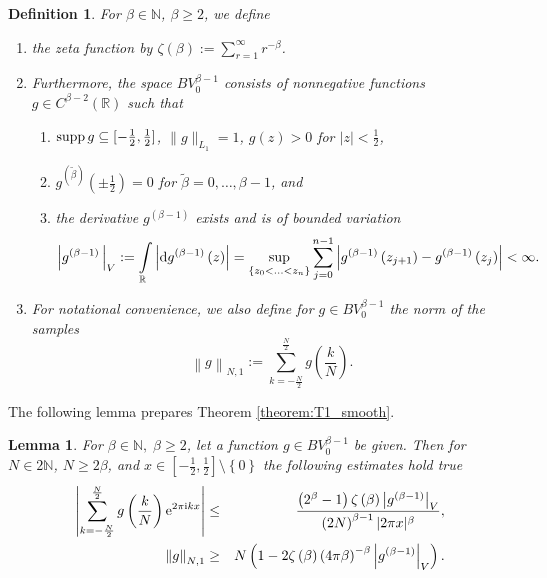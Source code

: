 \documentclass[11pt,a4paper,bibtotoc]{scrartcl}
\def\N{\mathbb{N}}
\def\R{\mathbb{R}}
\def\ti{\mbox{\scriptsize{\rm i}}}
\newcommand{\eip}[1]{{\rm e}^{ 2\pi{\ti} #1}}
\renewcommand{\d}{{\rm d}}
\newcommand{\supp}{{\rm supp}}
\newtheorem{lemma}[theorem]{Lemma}
\newtheorem{definition}[theorem]{Definition}
\newenvironment{Lemma}{\goodbreak \begin{lemma}\sl}{\end{lemma}}
\newenvironment{Definition}{\goodbreak \begin{definition}\rm}{\end{definition}}
\numberwithin{equation}{section}
\numberwithin{table}{section}
\numberwithin{figure}{section}
\begin{document}
\begin{Definition}\label{def:BV}
  For $\beta \in \N$, $\beta\ge 2$, we define
  \begin{enumerate}
  \item the {\em zeta function} by $\zeta(\beta):=\sum_{r=1}^{\infty} r^{-\beta}$.
  \item Furthermore, the {\em space} $BV^{\beta-1}_0$ consists of nonnegative
    functions $g \in C^{\beta-2}(\R)$ such that
    \begin{enumerate}
    \item $\supp\,g\subseteq [-\frac{1}{2},\frac{1}{2}]$, $\|g\|_{L_1}=1$,
      $g(z)>0$ for $|z|<\frac{1}{2}$,
    \item $g^{\left(\tilde\beta\right)}\left(\pm \frac{1}{2}\right)=0$ for
      $\tilde \beta=0,\ldots,\beta-1$, and
    \item the derivative $g^{\left(\beta-1\right)}$ exists and is of bounded
      variation 
      \begin{equation*}
        \left|g^{\left(\beta-1\right)}\,\right|_V
        := \int\limits_{\R}
        \left|\d g^{\left(\beta-1\right)}\left(z\right) \right |=
        \sup\limits_{\left\{z_0 < \hdots < z_n\right\}}
        \sum\limits_{j=0}^{n-1} \left|
          g^{\left(\beta-1\right)}\left(z_{j+1}\right) -
          g^{\left(\beta-1\right)}\left(z_{j}\right) \right| 
        < \infty.
      \end{equation*}
    \end{enumerate}
  \item For notational convenience, we also define for $g\in BV_0^{\beta-1}$
    the {\em norm of the samples}
    \begin{equation*}
      \left\|g\right\|_{N,1}:=\sum_{k=-\frac{N}{2}}^{\frac{N}{2}}
      g\left(\frac{k}{N}\right). 
    \end{equation*}
  \end{enumerate}
\end{Definition}

The following lemma prepares Theorem \ref{theorem:T1_smooth}.

\begin{Lemma}\label{lemma:decay_g}
  For $\beta \in \mathbb{N},\;\beta\ge 2$, let a function $g\in BV^{\beta-1}_0$
  be given.
  Then for $N\in 2\N$, $N\ge 2\beta$, and $x \in \left[-\frac{1}{2},
  \frac{1}{2}\right]\setminus\left\{0\right\}$ the following estimates
  hold true
  \begin{eqnarray*}
    \left| \sum\limits_{k=-\frac{N}{2}}^{\frac{N}{2}}
    g\left(\frac{k}{N}\right) \eip{kx} \right|
    & \le &
    \frac{\left(2^{\beta}-1\right)\zeta\left(\beta\right)
    \left|g^{\left(\beta-1\right)}\right|_V}  
    {\left(2N\right)^{\beta-1} |2\pi x|^{\beta}},\\
    \left\|g\right\|_{N,1}
    & \ge & 
    N\left(1-2\zeta\left(\beta\right) \left(4\pi \beta\right)^{-\beta}
    \left|g^{\left(\beta-1\right)}\right|_V\right). 
  \end{eqnarray*}
\end{Lemma}
\end{document}
